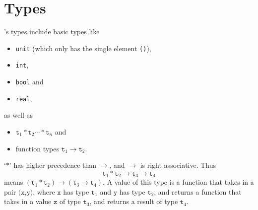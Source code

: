 \section{Types}
\EasyCrypt's types include basic types like \begin{itemize}
	\item \texttt{unit} (which only has the single element \texttt{()}),
	\item \texttt{int},
	\item \texttt{bool} and
	\item \texttt{real},
\end{itemize} as well as \begin{itemize}
\item $\texttt{t}_1*\texttt{t}_2\cdots*\texttt{t}_n$ and
\item function types $\texttt{t}_1\to\texttt{t}_2$.
\end{itemize} `$*$' has higher precedence than $\to$, and $\to$ is right associative. Thus \[
\texttt{t}_1*\texttt{t}_2\to\texttt{t}_3\to\texttt{t}_4
\] means $(\texttt{t}_1*\texttt{t}_2)\to(\texttt{t}_3\to\texttt{t}_4)$. A value of this type is a function that takes in a pair $\texttt{(x,y)}$, where $\texttt{x}$ has type $\texttt{t}_1$ and $\texttt{y}$ has type $\texttt{t}_2$, and returns a function that takes in a value $\texttt{z}$ of type $\texttt{t}_3$, and returns a result of type $\texttt{t}_4$.